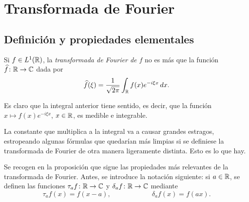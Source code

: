 \documentclass[a4paper, 12pt, extrafontsizes]{memoir}
\begin{document}
\chapter{Transformada de Fourier}\label{B}

\section{Definición y propiedades elementales}

\begin{definition}
    Si $f \in L^1(\mathbb R)$, la \emph{transformada de Fourier de $f$} no es más que la función $\widehat{f} \colon \mathbb R \to \mathbb C$ dada por
    \[\widehat{f}(\xi) = \frac{1}{\sqrt{2\pi}}\int_\mathbb R f(x)e^{-i\xi x} \, dx.\]
\end{definition}

Es claro que la integral anterior tiene sentido, es decir, que la función $x \mapsto f(x)e^{-i\xi x}$, $x \in \mathbb R$, es medible e integrable.

La constante que multiplica a la integral va a causar grandes estragos, estropeando algunas fórmulas que quedarían más limpias si se definiese la transformada de Fourier de otra manera ligeramente distinta. Esto es lo que hay.

Se recogen en la proposición que sigue las propiedades más relevantes de la transformada de Fourier. Antes, se introduce la notación siguiente: si $a \in \mathbb R$, se definen las funciones $\tau_af\colon \mathbb R \to \mathbb C$ y $\delta_af \colon \mathbb R \to \mathbb C$ mediante
\[\tau_af(x) = f(x-a), \qquad \qquad \qquad \delta_af(x)=f(ax).\]
\end{document}

